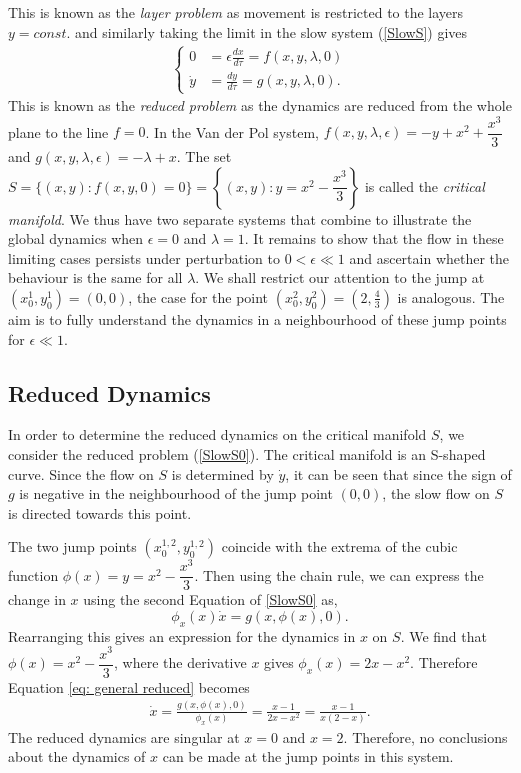 This is known as the \emph{layer problem} as movement is restricted to the layers $y=const.$ and similarly taking the limit in the slow system (\ref{SlowS}) gives
	\begin{align}\label{SlowS0}
		\begin{cases}
			0 &= \epsilon \frac{dx}{d \tau} = f(x,y,\lambda, 0)\\
			\dot{y} & = \frac{dy}{d \tau} =  g( x,y, \lambda,0).
		\end{cases}
	\end{align}
This is known as the \emph{reduced problem} as the dynamics are reduced from the whole plane to the line $f=0$. In the Van der Pol system, $f(x,y,\lambda,\epsilon)=-y+x^2+\dfrac{x^3}{3}$ and $g(x,y,\lambda,\epsilon)=-\lambda+x$. The set $S= \{ (x,y) : f(x,y,0)=0 \} = \left\{ (x,y) : y = x^2-\dfrac{x^3}{3}\right \}$ is called the \emph{critical manifold}. We thus have two separate systems that combine to illustrate the global dynamics when $\epsilon =0$ and $\lambda = 1$. It remains to show that the flow in these limiting cases persists under perturbation to $0<\epsilon \ll 1$ and ascertain whether the behaviour is the same for all $\lambda$. We shall restrict our attention to the jump at $ (x^1_0,y^1_0)=(0,0)$, the case for the point $(x^2_0,y^2_0)=(2,\frac{4}{3})$ is analogous. The aim is to fully understand the dynamics in a neighbourhood of these jump points for $\epsilon \ll 1$.

\subsection{Reduced Dynamics}
In order to determine the reduced dynamics on the critical manifold $S$, we consider the reduced problem (\ref{SlowS0}). The critical manifold is  an S-shaped curve. Since the flow on $S$ is determined by $\dot{y}$, it can be seen that since the sign of $g$ is negative in the neighbourhood of the jump point $(0,0)$, the slow flow on $S$ is directed towards this point.

The two jump points $(x_0^{1,2},y_0^{1,2})$ coincide with the extrema of the cubic function  $ \phi(x) = y = x^2-\dfrac{x^3}{3}$.
Then using the chain rule, we can express the change in $x$ using the second Equation of \ref{SlowS0} as,
\begin{equation}
\phi_x(x)\dot{x}=g(x,\phi(x),0).
\label{eq: general reduced}
\end{equation}
Rearranging this gives an expression for the dynamics in $x$ on $S$.
We find that $\phi(x)=x^2-\dfrac{x^3}{3}$, where the derivative \wrt $x$ gives $\phi_x(x)=2x-x^2$.
Therefore Equation \ref{eq: general reduced} becomes 
\begin{align*}
\dot{x} = \frac{g(x,\phi(x),0)}{ \phi_x(x)} = \frac{ x-1}{2x-x^2} =\frac{ x-1}{x(2-x)}.
\end{align*}
The reduced dynamics are singular at $x=0$ and $x=2$. Therefore, no conclusions about the dynamics of $x$ can be made at the jump points in this system. \\ 



